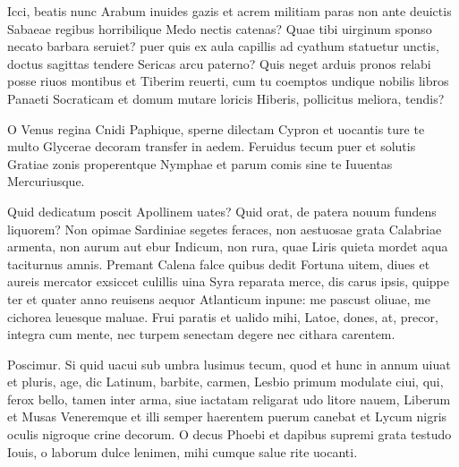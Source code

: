 \documentclass{book}
\newenvironment {carmen} [1] [\relax] 
  {\Titulus \Versus \incipit*\numerus{1}#1}
  {\endVersus}
\newcommand {\Sapphic}   {\Forma \strophae {0 \poena 00 \poena 1}}
\newcommand {\Alcaic}    {\Forma \strophae {0 \poena 01 \poena 2}}
\begin{document}
\begin{carmen}[\Alcaic]


 Icci, beatis nunc Arabum inuides
 gazis et acrem militiam paras
      non ante deuictis Sabaeae
      regibus horribilique Medo
 nectis catenas? Quae tibi uirginum               
 sponso necato barbara seruiet?
      puer quis ex aula capillis
      ad cyathum statuetur unctis,
 doctus sagittas tendere Sericas
 arcu paterno? Quis neget arduis               
      pronos relabi posse riuos
      montibus et Tiberim reuerti,
 cum tu coemptos undique nobilis
 libros Panaeti Socraticam et domum
       mutare loricis Hiberis,
      pollicitus meliora, tendis?                

\end{carmen}

\begin{carmen}[\Sapphic]


O Venus regina Cnidi Paphique,
 sperne dilectam Cypron et uocantis
 ture te multo Glycerae decoram
      transfer in aedem.
 Feruidus tecum puer et solutis               
 Gratiae zonis properentque Nymphae
 et parum comis sine te Iuuentas
      Mercuriusque. 

\end{carmen}

\begin{carmen}[\Alcaic]


 Quid dedicatum poscit Apollinem
 uates? Quid orat, de patera nouum
      fundens liquorem? Non opimae
      Sardiniae segetes feraces,
 non aestuosae grata Calabriae               
 armenta, non aurum aut ebur Indicum,
      non rura, quae Liris quieta
      mordet aqua taciturnus amnis.
 Premant Calena falce quibus dedit
 Fortuna uitem, diues et aureis               
      mercator exsiccet culillis
      uina Syra reparata merce,
 dis carus ipsis, quippe ter et quater
 anno reuisens aequor Atlanticum
       inpune: me pascust oliuae,
      me cichorea leuesque maluae.               
 Frui paratis et ualido mihi,
 Latoe, dones, at, precor, integra
      cum mente, nec turpem senectam
       degere nec cithara carentem.                

\end{carmen}

\begin{carmen}[\Sapphic]


 Poscimur. Si quid uacui sub umbra
 lusimus tecum, quod et hunc in annum
 uiuat et pluris, age, dic Latinum,
      barbite, carmen,
 Lesbio primum modulate ciui,               
 qui, ferox bello, tamen inter arma,
 siue iactatam religarat udo
      litore nauem,
 Liberum et Musas Veneremque et illi
 semper haerentem puerum canebat               
 et Lycum nigris oculis nigroque
      crine decorum.
 O decus Phoebi et dapibus supremi
 grata testudo Iouis, o laborum
 dulce lenimen, mihi cumque salue               
      rite uocanti. 

\end{carmen}
\end{document}
